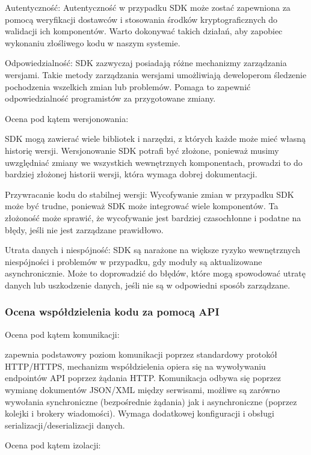 \documentclass[runningheads,12pt]{llncs}
\begin{document}
Autentyczność: Autentyczność w przypadku SDK może zostać zapewniona za pomocą weryfikacji dostawców i stosowania środków kryptograficznych do walidacji ich komponentów. Warto dokonywać takich działań, aby zapobiec wykonaniu złośliwego kodu w naszym systemie. ~\cite[para 7]{azure2020}

Odpowiedzialność: SDK zazwyczaj posiadają różne mechanizmy zarządzania wersjami. Takie metody zarządzania wersjami umożliwiają deweloperom śledzenie pochodzenia wszelkich zmian lub problemów. Pomaga to zapewnić odpowiedzialność programistów za przygotowane zmiany. ~\cite[para 7]{azure2020}

Ocena pod kątem wersjonowania:

SDK mogą zawierać wiele bibliotek i narzędzi, z których każde może mieć własną historię wersji. Wersjonowanie SDK potrafi być złożone, ponieważ musimy uwzględniać zmiany we wszystkich wewnętrznych komponentach, prowadzi to do bardziej złożonej historii wersji, która wymaga dobrej dokumentacji. ~\cite[para. 3]{azure2020}

Przywracanie kodu do stabilnej wersji: Wycofywanie zmian w przypadku SDK może być trudne, ponieważ SDK może integrować wiele komponentów. Ta złożoność może sprawić, że wycofywanie jest bardziej czasochłonne i podatne na błędy, jeśli nie jest zarządzane prawidłowo. ~\cite[para. 3]{azure2020}

Utrata danych i niespójność: SDK są narażone na większe ryzyko wewnętrznych niespójności i problemów w przypadku, gdy moduły są aktualizowane asynchronicznie. Może to doprowadzić do błędów, które mogą spowodować utratę danych lub uszkodzenie danych, jeśli nie są w odpowiedni sposób zarządzane. ~\cite[para. 3]{azure2020}
\subsubsection{Ocena współdzielenia kodu za pomocą API}

Ocena pod kątem komunikacji: 

zapewnia podstawowy poziom komunikacji poprzez standardowy protokół HTTP/HTTPS, mechanizm współdzielenia opiera się na wywoływaniu endpointów API poprzez żądania HTTP. Komunikacja odbywa się poprzez wymianę dokumentów JSON/XML między serwisami, możliwe są zarówno wywołania synchroniczne (bezpośrednie żądania) jak i asynchroniczne (poprzez kolejki i brokery wiadomości). Wymaga dodatkowej konfiguracji i obsługi serializacji/deserializacji danych.

Ocena pod kątem izolacji:
\end{document}
